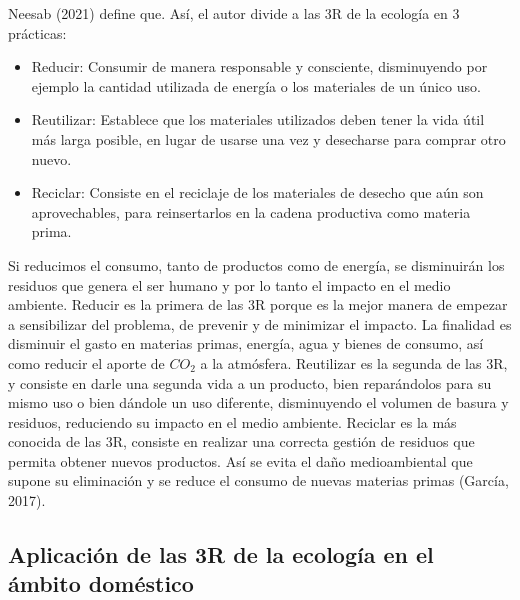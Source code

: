 Neesab (2021) define que. Así, el autor divide a las 3R de la ecología en 3 prácticas:

\begin{itemize}
    \item Reducir: Consumir de manera responsable y consciente, disminuyendo por ejemplo la cantidad utilizada de energía o los materiales de un único uso.
    
    \item Reutilizar: Establece que los materiales utilizados deben tener la vida útil más larga posible, en lugar de usarse una vez y desecharse para comprar otro nuevo.
    
    \item Reciclar: Consiste en el reciclaje de los materiales de desecho que aún son aprovechables, para reinsertarlos en la cadena productiva como materia prima.
\end{itemize}

Si reducimos el consumo, tanto de productos como de energía, se disminuirán los residuos que genera el ser humano y por lo tanto el impacto en el medio ambiente. Reducir es la primera de las 3R porque es la mejor manera de empezar a sensibilizar del problema, de prevenir y de minimizar el impacto. La finalidad es disminuir el gasto en materias primas, energía, agua y bienes de consumo, así como reducir el aporte de $CO_2$ a la atmósfera. Reutilizar es la segunda de las 3R, y consiste en darle una segunda vida a un producto, bien reparándolos para su mismo uso o bien dándole un uso diferente, disminuyendo el volumen de basura y residuos, reduciendo su impacto en el medio ambiente. Reciclar es la más conocida de las 3R, consiste en realizar una correcta gestión de residuos que permita obtener nuevos productos. Así se evita el daño medioambiental que supone su eliminación y se reduce el consumo de nuevas materias primas (García, 2017).

\subsection{Aplicación de las 3R de la ecología en el ámbito doméstico}

